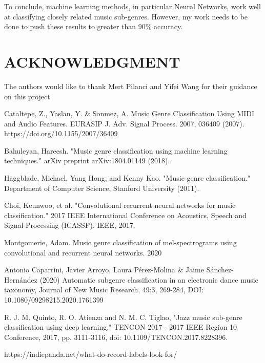 \documentclass[letterpaper, 12 pt, conference]{ieeeconf}  %
\begin{document}
To conclude, machine learning methods, in particular Neural Networks, work well at classifying closely related music sub-genres. However, my work needs to be done to push these results to greater than 90\% accuracy. 



\section*{ACKNOWLEDGMENT}

The authors would like to thank Mert Pilanci and Yifei Wang for their guidance on this project



\begin{thebibliography}{99}



 Cataltepe, Z., Yaslan, Y. & Sonmez, A. Music Genre Classification Using MIDI and Audio Features. EURASIP J. Adv. Signal Process. 2007, 036409 (2007). https://doi.org/10.1155/2007/36409

 Bahuleyan, Hareesh. "Music genre classification using machine learning techniques." arXiv preprint arXiv:1804.01149 (2018)..

 Haggblade, Michael, Yang Hong, and Kenny Kao. "Music genre classification." Department of Computer Science, Stanford University (2011). 

 Choi, Keunwoo, et al. "Convolutional recurrent neural networks for music classification." 2017 IEEE International Conference on Acoustics, Speech and Signal Processing (ICASSP). IEEE, 2017.


 Montgomerie, Adam.  Music genre classification of mel-spectrograms using convolutional and
recurrent neural networks. 2020

  Antonio Caparrini, Javier Arroyo, Laura Pérez-Molina & Jaime Sánchez-Hernández (2020) Automatic subgenre classification in an electronic dance music taxonomy, Journal of New Music Research, 49:3, 269-284, DOI: 10.1080/09298215.2020.1761399



 R. J. M. Quinto, R. O. Atienza and N. M. C. Tiglao, "Jazz music sub-genre classification using deep learning," TENCON 2017 - 2017 IEEE Region 10 Conference, 2017, pp. 3111-3116, doi: 10.1109/TENCON.2017.8228396.


 https://indiepanda.net/what-do-record-labels-look-for/


\end{thebibliography}
\end{document}
